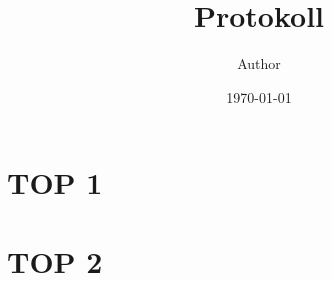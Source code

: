 \documentclass{article}
\title{Protokoll}
\author{Author}
\date{\today}
\begin{document}
\maketitle

\tableofcontents

\newpage

\section{TOP 1}
  \lipsum[1-3]

\section{TOP 2}
  \lipsum[1-3]
\end{document}
